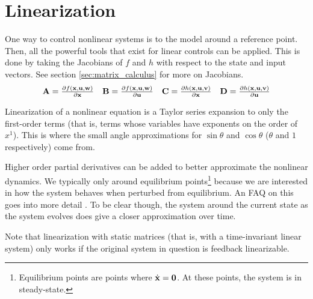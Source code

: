 \section{Linearization}

One way to control nonlinear \glspl{system} is to
 the \gls{model} around a reference point.
Then, all the powerful tools that exist for linear controls can be applied. This
is done by taking the Jacobians of $f$ and $h$ with respect to the state and
input vectors. See section \ref{sec:matrix_calculus} for more on Jacobians.
\begin{align*}
  \begin{array}{cccc}
    \mathbf{A} = \frac{\partial f(\mathbf{x}, \mathbf{u}, \mathbf{w})}{\partial \mathbf{x}} &
    \mathbf{B} = \frac{\partial f(\mathbf{x}, \mathbf{u}, \mathbf{w})}{\partial \mathbf{u}} &
    \mathbf{C} = \frac{\partial h(\mathbf{x}, \mathbf{u}, \mathbf{v})}{\partial \mathbf{x}} &
    \mathbf{D} = \frac{\partial h(\mathbf{x}, \mathbf{u}, \mathbf{v})}{\partial \mathbf{u}}
  \end{array}
\end{align*}

Linearization of a nonlinear equation is a Taylor series expansion to only the
first-order terms (that is, terms whose variables have exponents on the order of
$x^1$). This is where the small angle approximations for $\sin\theta$ and
$\cos\theta$ ($\theta$ and $1$ respectively) come from.

Higher order partial derivatives can be added to better approximate the
nonlinear dynamics. We typically only  around
equilibrium points\footnote{Equilibrium points are points where
$\dot{\mathbf{x}} = \mathbf{0}$. At these points, the system is in steady-state.}
because we are interested in how the \gls{system} behaves when perturbed from
equilibrium. An FAQ on this goes into more detail
\cite{bib:linearize_equilibrium_point}. To be clear though,
 the \gls{system} around the current
\gls{state} as the \gls{system} evolves does give a closer approximation over
time.

Note that linearization with static matrices (that is, with a time-invariant
linear \gls{system}) only works if the original \gls{system} in question is
feedback linearizable.

